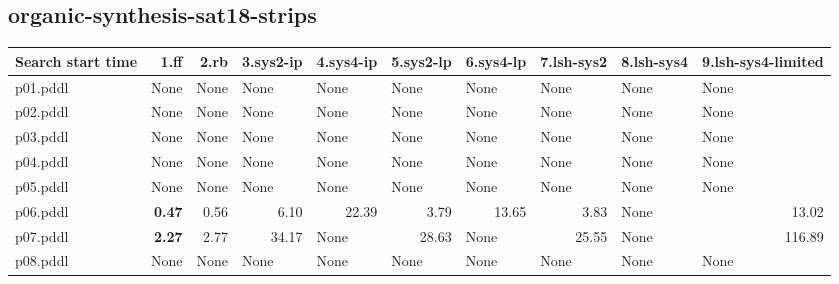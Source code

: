 \documentclass{article}
\begin{document}
\hypertarget{search_start_time-organic-synthesis-sat18-strips}{}
\subsection*{organic-synthesis-sat18-strips}

\begin{tabular}{@{}lrrrrrrrrr@{}}
Search start time & 1.ff & 2.rb & 3.sys2-ip & 4.sys4-ip & 5.sys2-lp & 6.sys4-lp & 7.lsh-sys2 & 8.lsh-sys4 & 9.lsh-sys4-limited \\
\midrule
p01.pddl & \multicolumn{1}{|l|}{None} & \multicolumn{1}{|l|}{None} & \multicolumn{1}{|l|}{None} & \multicolumn{1}{|l|}{None} & \multicolumn{1}{|l|}{None} & \multicolumn{1}{|l|}{None} & \multicolumn{1}{|l|}{None} & \multicolumn{1}{|l|}{None} & \multicolumn{1}{|l|}{None} \\
p02.pddl & \multicolumn{1}{|l|}{None} & \multicolumn{1}{|l|}{None} & \multicolumn{1}{|l|}{None} & \multicolumn{1}{|l|}{None} & \multicolumn{1}{|l|}{None} & \multicolumn{1}{|l|}{None} & \multicolumn{1}{|l|}{None} & \multicolumn{1}{|l|}{None} & \multicolumn{1}{|l|}{None} \\
p03.pddl & \multicolumn{1}{|l|}{None} & \multicolumn{1}{|l|}{None} & \multicolumn{1}{|l|}{None} & \multicolumn{1}{|l|}{None} & \multicolumn{1}{|l|}{None} & \multicolumn{1}{|l|}{None} & \multicolumn{1}{|l|}{None} & \multicolumn{1}{|l|}{None} & \multicolumn{1}{|l|}{None} \\
p04.pddl & \multicolumn{1}{|l|}{None} & \multicolumn{1}{|l|}{None} & \multicolumn{1}{|l|}{None} & \multicolumn{1}{|l|}{None} & \multicolumn{1}{|l|}{None} & \multicolumn{1}{|l|}{None} & \multicolumn{1}{|l|}{None} & \multicolumn{1}{|l|}{None} & \multicolumn{1}{|l|}{None} \\
p05.pddl & \multicolumn{1}{|l|}{None} & \multicolumn{1}{|l|}{None} & \multicolumn{1}{|l|}{None} & \multicolumn{1}{|l|}{None} & \multicolumn{1}{|l|}{None} & \multicolumn{1}{|l|}{None} & \multicolumn{1}{|l|}{None} & \multicolumn{1}{|l|}{None} & \multicolumn{1}{|l|}{None} \\
p06.pddl & \textbf{0.47} & 0.56 & 6.10 & 22.39 & 3.79 & 13.65 & 3.83 & \multicolumn{1}{|l|}{None} & 13.02 \\
p07.pddl & \textbf{2.27} & 2.77 & 34.17 & \multicolumn{1}{|l|}{None} & 28.63 & \multicolumn{1}{|l|}{None} & 25.55 & \multicolumn{1}{|l|}{None} & 116.89 \\
p08.pddl & \multicolumn{1}{|l|}{None} & \multicolumn{1}{|l|}{None} & \multicolumn{1}{|l|}{None} & \multicolumn{1}{|l|}{None} & \multicolumn{1}{|l|}{None} & \multicolumn{1}{|l|}{None} & \multicolumn{1}{|l|}{None} & \multicolumn{1}{|l|}{None} & \multicolumn{1}{|l|}{None} \\

\end{tabular}
\end{document}

